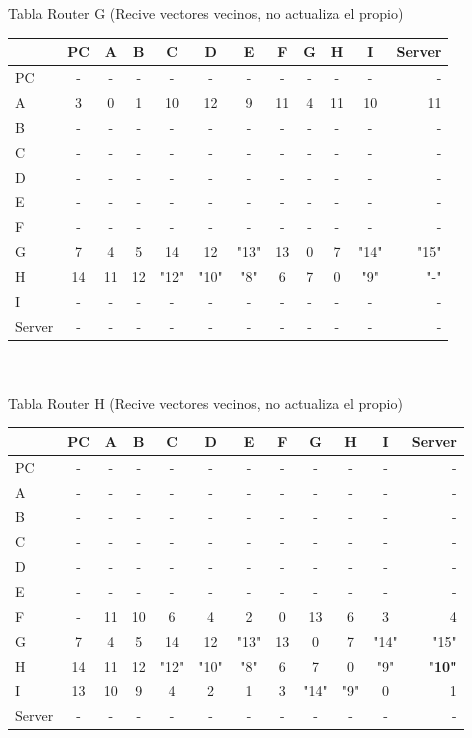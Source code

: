 \documentclass{article}
\begin{document}
\\
\\
Tabla Router G (Recive vectores vecinos, no actualiza el propio) \\
\begin{tabular}{l*{10}{c}r}
              & PC & A & B & C & D & E & F & G & H & I & Server \\
\hline
PC             & - & - & - & - & - & - & - & - & - & - & -\\
A              & 3 & 0 & 1 & 10 & 12 & 9 & 11 & 4 & 11 & 10 & 11 \\
B              & - & - & - & - & - & - & - & - & - & - & -\\
C              & - & - & - & - & - & - & - & - & - & - & -\\
D              & - & - & - & - & - & - & - & - & - & - & -\\
E              & - & - & - & - & - & - & - & - & - & - & -\\
F              & - & - & - & - & - & - & - & - & - & - & -\\
G              & 7 & 4 & 5 & 14 & 12 & "13" & 13 & 0 & 7 & "14" & "15"\\
H              & 14 & 11 & 12 & "12" & "10" & "8" & 6 & 7 & 0 & "9" & "-"\\
I              & - & - & - & - & - & - & - & - & - & - & -\\
Server         & - & - & - & - & - & - & - & - & - & - & -\\

\end{tabular}
\\
\\
Tabla Router H (Recive vectores vecinos, no actualiza el propio) \\
\begin{tabular}{l*{10}{c}r}
              & PC & A & B & C & D & E & F & G & H & I & Server \\
\hline
PC             & - & - & - & - & - & - & - & - & - & - & - \\
A              & - & - & - & - & - & - & - & - & - & - & - \\
B              & - & - & - & - & - & - & - & - & - & - & - \\
C              & - & - & - & - & - & - & - & - & - & - & - \\
D              & - & - & - & - & - & - & - & - & - & - & - \\
E              & - & - & - & - & - & - & - & - & - & - & - \\
F              & - & 11 & 10 & 6 & 4 & 2 & 0 & 13 & 6 & 3 & 4\\
G              & 7 & 4 & 5 & 14 & 12 & "13" & 13 & 0 & 7 & "14" & "15"\\
H              & 14 & 11 & 12 & "12" & "10" & "8" & 6 & 7 & 0 & "9" & "\bf{10}"\\
I              & 13 & 10 & 9 & 4 & 2 & 1 & 3 & "14" & "9" & 0 & 1\\
Server         & - & - & - & - & - & - & - & - & - & - & - \\

\end{tabular}
\end{document}
